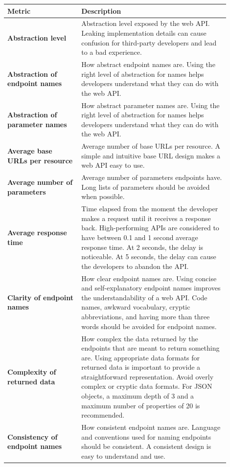 \documentclass[12pt]{article}
\begin{document}
	\begin{center}
		{\scriptsize \begin{longtable}{p{0.3\linewidth}p{0.6\linewidth}}	
			\hline
			\textbf{Metric} & \textbf{Description}\\
			\hline
			\textbf{Abstraction level} & Abstraction level exposed by the web API. Leaking implementation details can cause confusion for third-party developers and lead to a bad experience.\\
			\hline
			\textbf{Abstraction of endpoint names} & How abstract endpoint names are. Using the right level of abstraction for names helps developers understand what they can do with the web API.\\
			\hline
			\textbf{Abstraction of parameter names} & How abstract parameter names are. Using the right level of abstraction for names helps developers understand what they can do with the web API.\\
			\hline
			\textbf{Average base URLs per resource} & Average number of base URLs per resource. A simple and intuitive base URL design makes a web API easy to use.\\
			\hline
			\textbf{Average number of parameters} & Average number of parameters endpoints have. Long lists of parameters should be avoided when possible.\\
			\hline
			\textbf{Average response time} & Time elapsed from the moment the developer makes a request until it receives a response back. High-performing APIs are considered to have between 0.1 and 1 second average response time. At 2 seconds, the delay is noticeable. At 5 seconds, the delay can cause the developers to abandon the API.\\
			\hline
			\textbf{Clarity of endpoint names} & How clear endpoint names are. Using concise and self-explanatory endpoint names improves the understandability of a web API. Code names, awkward vocabulary, cryptic abbreviations, and having more than three words should be avoided for endpoint names.\\
			\hline
			\textbf{Complexity of returned data} & How complex the data returned by the endpoints that are meant to return something are. Using appropriate data formats for returned data is important to provide a straightforward representation. Avoid overly complex or cryptic data formats. For JSON objects, a maximum depth of 3 and a maximum number of properties of 20 is recommended.\\
			\hline
			\textbf{Consistency of endpoint names} & How consistent endpoint names are. Language and conventions used for naming endpoints should be consistent. A consistent design is easy to understand and use.\\

\end{longtable}}
\end{center}
\end{document}
